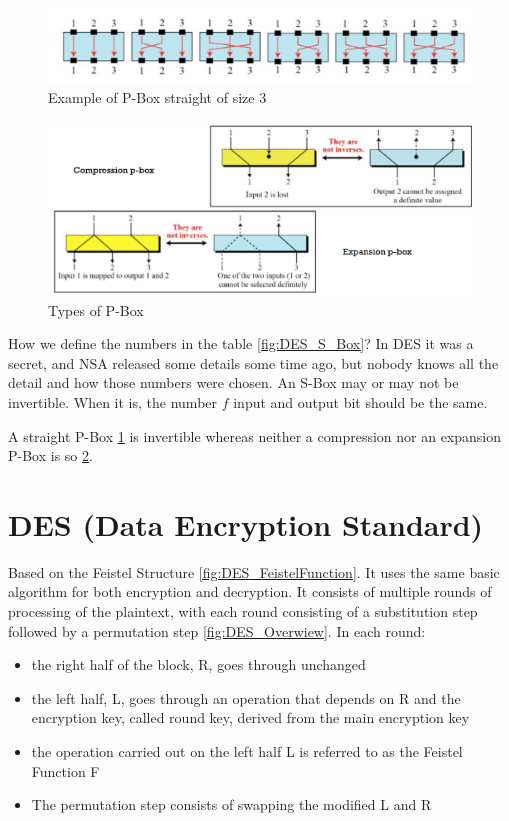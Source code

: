 \begin{figure}
	\centering
	\includegraphics[width=0.7\linewidth]{Images/Chapter3/P_Box_3}
	\caption{Example of P-Box straight of size 3}
	\label{fig:P_Box_3}
\end{figure}

\begin{figure}
	\centering
	\includegraphics[width=0.7\linewidth]{Images/Chapter3/Expansion_Compression_PBoxes}
	\caption{Types of P-Box}
	\label{fig:Expansion_Compression_PBoxes}
\end{figure}



How we define the numbers in the table \ref{fig:DES_S_Box}? In DES it was a secret, and NSA released some details some time ago, but nobody knows all the detail and how those numbers were chosen. An S-Box may or may not be invertible. When it is, the number $f$ input and output bit should be the same.

A straight P-Box \ref{fig:P_Box_3} is invertible whereas neither a compression nor an expansion P-Box is so \ref{fig:Expansion_Compression_PBoxes}.

\section{DES (Data Encryption Standard)}
Based on the Feistel Structure \ref{fig:DES_FeistelFunction}.
It uses the same basic algorithm for both encryption and decryption. It consists of multiple rounds of processing of the plaintext, with each round consisting of a substitution step followed by a permutation step \ref{fig:DES_Overwiew}. In each round:
\begin{itemize}
	\item the right half of the block, R, goes through unchanged
	\item the left half, L, goes through an operation that depends on R and the encryption key, called round key, derived from the main encryption key
	\item the operation carried out on the left half L is referred to as the Feistel Function F
	\item The permutation step consists of swapping the modified L and R
\end{itemize}

